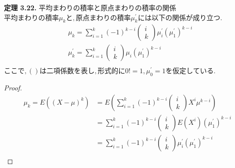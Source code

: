 \documentclass[dvipdfmx,10pt, a4j]{jarticle}
\theoremstyle{definition}
\begin{document}
\noindent
\textbf{定理 3.22.} 平均まわりの積率と原点まわりの積率の関係\\
$平均まわりの積率 \mu_k と, 原点まわりの積率 \mu_k^{\prime}には以下の関係が成り立つ.$\\
\begin{align*}
     & \mu_k = \sum_{i=1}^{k}{(-1)^{k-i}}
    \left( \begin{array}{c}
            i \\
            k
        \end{array}
    \right)
    \mu_i^{\prime}(\mu_1^{\prime})^{k-i}  \\
     & \mu_k^{\prime} = \sum_{i=1}^{k}
    \left( \begin{array}{c}
            i \\
            k
        \end{array}
    \right)
    \mu_i(\mu_1^{\prime})^{k-i}           \\
\end{align*}
$ここで, ()は二項係数を表し, 形式的に 0! = 1, \mu_0^{\prime} = 1を仮定している.$\\
\begin{proof}

    \begin{align*}
        \mu_k = E((X-\mu)^k) & = E(\sum_{i=1}^{k}{(-1)^{k-i}
        \left(
        \begin{array}{c}
                i \\
                k
            \end{array}
        \right)
        X^i \mu^{k-i}})                                      \\
                             & = \sum_{i=1}^{k}{(-1)^{k-i}
        \left(
        \begin{array}{c}
                i \\
                k
            \end{array}
        \right)
        E(X^i)(\mu_1^{\prime})^{k-i}}                        \\
                             & = \sum_{i=1}^{k}{(-1)^{k-i}
        \left(
        \begin{array}{c}
                i \\
                k
            \end{array}
        \right)
        \mu_i^{\prime}(\mu_1^{\prime})^{k-i}}                \\
    \end{align*}
\end{proof}
\end{document}
